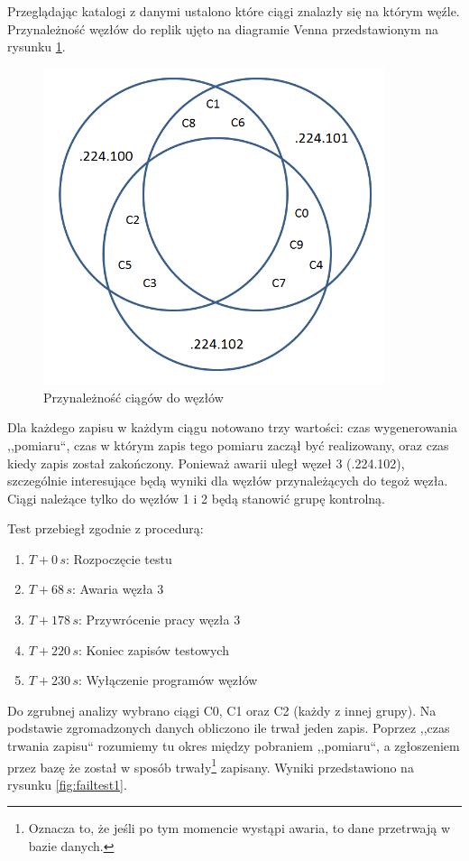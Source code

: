 \documentclass[a4paper,polish,12pt,twoside]{article}
\begin{document}
	Przeglądając katalogi z danymi ustalono które ciągi znalazły się na którym węźle. Przynależność węzłów do replik ujęto na diagramie Venna przedstawionym na rysunku \ref{fig:venn1}.
	
	\begin{figure}[h]
		\centering \includegraphics[width=10cm]{venn1}
		\caption{Przynależność ciągów do węzłów}
		\label{fig:venn1}
	\end{figure}

Dla każdego zapisu w każdym ciągu notowano trzy wartości: czas wygenerowania ,,pomiaru``, czas w którym zapis tego pomiaru zaczął być realizowany, oraz czas kiedy zapis został zakończony. Ponieważ awarii uległ węzeł 3 (.224.102), szczególnie interesujące będą wyniki dla węzłów przynależących do tegoż węzła. Ciągi należące tylko do węzłów 1 i 2 będą stanowić grupę kontrolną.

Test przebiegł zgodnie z procedurą:
\begin{enumerate}
	\item $T+0\,s$: Rozpoczęcie testu
	\item $T+68\,s$: Awaria węzła 3
	\item $T+178\,s$: Przywrócenie pracy węzła 3
	\item $T+220\,s$: Koniec zapisów testowych
	\item $T+230\,s$: Wyłączenie programów węzłów
\end{enumerate}

Do zgrubnej analizy wybrano ciągi C0, C1 oraz C2 (każdy z innej grupy). Na podstawie zgromadzonych danych obliczono ile trwał jeden zapis. Poprzez ,,czas trwania zapisu`` rozumiemy tu okres między pobraniem ,,pomiaru``, a zgłoszeniem przez bazę że został w sposób trwały\footnote{Oznacza to, że jeśli po tym momencie wystąpi awaria, to dane przetrwają w bazie danych.} zapisany. Wyniki przedstawiono na rysunku \ref{fig:failtest1}.
\end{document}

